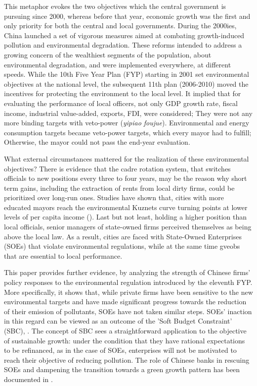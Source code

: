 \documentclass[12pt]{article}
\begin{document}
This metaphor evokes the two objectives which the central government is pursuing since 2000, whereas before that year, economic growth was the first and only priority for both the central and local governments. During the 2000ies, China launched a set of vigorous measures aimed at combating growth-induced pollution and environmental degradation. These reforms intended to address a growing concern of the wealthiest segments of the population, about environmental degradation, and were implemented everywhere, at different speeds. While the 10th Five Year Plan (FYP) starting in 2001 set environmental objectives at the national level, the subsequent 11th plan (2006-2010) moved the incentives for protecting the environment to the local level. It implied that for evaluating the performance of local officers, not only GDP growth rate, fiscal income, industrial value-added, exports, FDI, were considered; They were not any more binding targets with veto-power (\textit{yipiao foujue}). Environmental and energy consumption targets became veto-power targets, which every mayor had to fulfill; Otherwise, the mayor could not pass the end-year evaluation. 


What external circumstances mattered for the realization of these environmental objectives? There is evidence that the cadre rotation system, that switches officials to new positions every three to four years, may be the reason why short term gains, including the extraction of rents from local dirty firms, could be prioritized over long-run ones. Studies have shown that, cities with more educated mayors reach the environmental Kuznets curve turning points at lower levels of per capita income (\cite{Zheng2014-ut}). Last but not least, holding a higher position than local officials, senior managers of state-owned firms perceived themselves as being above the local law. As a result, cities are faced with State-Owned Enterprises (SOEs) that violate environmental regulations, while at the same time gveobs that are essential to local performance. 


This paper provides further evidence, by analyzing the strength of Chinese firms' policy responses to the environmental regulation introduced by the eleventh FYP. More specifically, it shows that, while private firms have been sensitive to the new environmental targets and have made significant progress towards the reduction of their emission of pollutants, SOEs have not taken similar steps. SOEs' inaction in this regard can be viewed as an outcome of the 'Soft Budget Constraint' (SBC), \cite{Kornai2003-nv}. The concept of SBC sees a straightforward application to the objective of sustainable growth: under the condition that they have rational expectations to be refinanced, as in the case of SOEs, enterprises will not be motivated to reach their objective of reducing pollution. The role of Chinese banks in rescuing SOEs and dampening the transition towards a green growth pattern has been documented in \cite{Maurel2019-ap}. 
\end{document}
